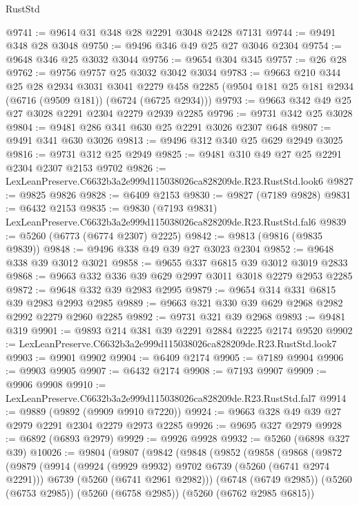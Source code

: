\begin{lexlean}{RustStd}
\begin{coremodule}
@9741 := @9614 @31 @348 @28 @2291 @3048 @2428 @7131
@9744 := @9491 @348 @28 @3048
@9750 := @9496 @346 @49 @25 @27 @3046 @2304
@9754 := @9648 @346 @25 @3032 @3044
@9756 := @9654 @304 @345
@9757 := @26 @28
@9762 := @9756 @9757 @25 @3032 @3042 @3034
@9783 := @9663
    @210
    @344
    @25
    @28
    @2934
    @3031
    @3041
    @2279
    @458
    @2285
    (@9504 @181 @25 @181 @2934 (@6716 (@9509 @181)) (@6724 (@6725 @2934)))
@9793 := @9663 @342 @49 @25 @27 @3028 @2291 @2304 @2279 @2939 @2285
@9796 := @9731 @342 @25 @3028
@9804 := @9481 @286 @341 @630 @25 @2291 @3026 @2307 @648
@9807 := @9491 @341 @630 @3026
@9813 := @9496 @312 @340 @25 @629 @2949 @3025
@9816 := @9731 @312 @25 @2949
@9825 := @9481 @310 @49 @27 @25 @2291 @2304 @2307 @2153 @9702
@9826 := LexLeanPreserve.C6632b3a2e999d115038026ca828209de.R23.RustStd.look6
@9827 := @9825 @9826
@9828 := @6409 @2153
@9830 := @9827 (@7189 @9828)
@9831 := @6432 @2153
@9835 := @9830 (@7193 @9831) LexLeanPreserve.C6632b3a2e999d115038026ca828209de.R23.RustStd.fal6
@9839 := @5260 (@6773 (@6774 @2307) @2225)
@9842 := @9813 (@9816 (@9835 @9839))
@9848 := @9496 @338 @49 @39 @27 @3023 @2304
@9852 := @9648 @338 @39 @3012 @3021
@9858 := @9655 @337 @6815 @39 @3012 @3019 @2833
@9868 := @9663 @332 @336 @39 @629 @2997 @3011 @3018 @2279 @2953 @2285
@9872 := @9648 @332 @39 @2983 @2995
@9879 := @9654 @314 @331 @6815 @39 @2983 @2993 @2985
@9889 := @9663 @321 @330 @39 @629 @2968 @2982 @2992 @2279 @2960 @2285
@9892 := @9731 @321 @39 @2968
@9893 := @9481 @319
@9901 := @9893 @214 @381 @39 @2291 @2884 @2225 @2174 @9520
@9902 := LexLeanPreserve.C6632b3a2e999d115038026ca828209de.R23.RustStd.look7
@9903 := @9901 @9902
@9904 := @6409 @2174
@9905 := @7189 @9904
@9906 := @9903 @9905
@9907 := @6432 @2174
@9908 := @7193 @9907
@9909 := @9906 @9908
@9910 := LexLeanPreserve.C6632b3a2e999d115038026ca828209de.R23.RustStd.fal7
@9914 := @9889 (@9892 (@9909 @9910 @7220))
@9924 := @9663 @328 @49 @39 @27 @2979 @2291 @2304 @2279 @2973 @2285
@9926 := @9695 @327 @2979
@9928 := @6892 (@6893 @2979)
@9929 := @9926 @9928
@9932 := @5260 (@6898 @327 @39)
@10026 := @9804
    (@9807
      (@9842
        (@9848
          (@9852
            (@9858
              (@9868
                (@9872
                  (@9879
                    (@9914
                      (@9924 (@9929 @9932) @9702 @6739 (@5260 (@6741 @2974 @2291)))
                      @6739
                      (@5260 (@6741 @2961 @2982)))
                    (@6748 (@6749 @2985))
                    (@5260 (@6753 @2985))
                    (@5260 (@6758 @2985))
                    (@5260 (@6762 @2985 @6815))

\end{coremodule}
\end{lexlean}
